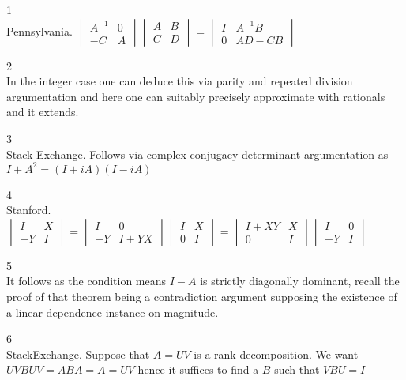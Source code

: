 1 \\
Pennsylvania.
$
\begin{vmatrix}
A^{-1} & 0 \\
-C & A
\end{vmatrix}
\begin{vmatrix}
A & B \\
C & D
\end{vmatrix}
=
\begin{vmatrix}
I & A^{-1}B \\
0 & AD-CB
\end{vmatrix}
$

2 \\
In the integer case one can deduce this via parity and repeated division argumentation and here one can suitably precisely approximate with rationals and it extends.

3 \\
Stack Exchange. Follows via complex conjugacy determinant argumentation as $I+A^2=(I+iA)(I-iA)$

4 \\
Stanford.
$
\begin{vmatrix}
I & X \\
-Y & I
\end{vmatrix}
=
\begin{vmatrix}
I & 0 \\
-Y & I+YX
\end{vmatrix}
\begin{vmatrix}
I & X \\
0 & I 
\end{vmatrix}
=
\begin{vmatrix}
I+XY & X \\
0 & I
\end{vmatrix}
\begin{vmatrix}
I & 0 \\
-Y & I
\end{vmatrix}
$

5 \\
It follows as the condition means $I-A$ is strictly diagonally dominant, recall the proof of that theorem being a contradiction argument supposing the existence of a linear dependence instance on magnitude.

6 \\
StackExchange. Suppose that $A=UV$ is a rank decomposition. We want $UVBUV=ABA=A=UV$ hence it suffices to find a $B$ such that $VBU=I$


